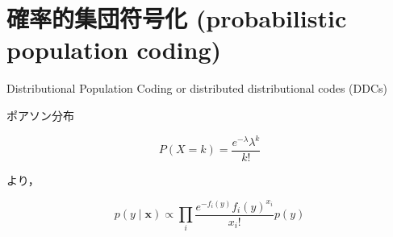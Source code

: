\section{確率的集団符号化 (probabilistic population coding)}

Distributional Population Coding or distributed distributional codes (DDCs)

ポアソン分布


\begin{equation}
P(X=k)={\frac  {e^{-\lambda} \lambda^k}{k!}}
\end{equation}


より，


\begin{equation}
p(y \mid \mathbf{x}) \propto \prod_{i} \frac{e^{-f_{i}(y)} f_{i}(y)^{x_{i}}}{x_{i} !} p(y)
\end{equation}
